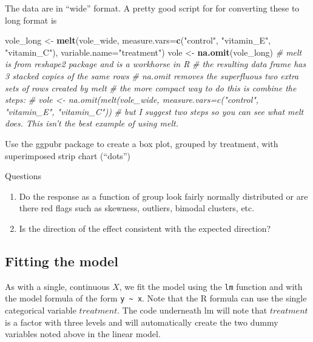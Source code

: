 \documentclass[]{book}
\newenvironment{Shaded}{\begin{snugshade}}{\end{snugshade}}
\newcommand{\KeywordTok}[1]{\textcolor[rgb]{0.13,0.29,0.53}{\textbf{#1}}}
\newcommand{\DataTypeTok}[1]{\textcolor[rgb]{0.13,0.29,0.53}{#1}}
\newcommand{\StringTok}[1]{\textcolor[rgb]{0.31,0.60,0.02}{#1}}
\newcommand{\CommentTok}[1]{\textcolor[rgb]{0.56,0.35,0.01}{\textit{#1}}}
\newcommand{\NormalTok}[1]{#1}
\providecommand{\tightlist}{%
  \setlength{\itemsep}{0pt}\setlength{\parskip}{0pt}}
\theoremstyle{definition}
\theoremstyle{definition}
\theoremstyle{definition}
\theoremstyle{remark}
\begin{document}
The data are in ``wide'' format. A pretty good script for for converting
these to long format is

\begin{Shaded}
\begin{Highlighting}[]
\NormalTok{vole_long <-}\StringTok{ }\KeywordTok{melt}\NormalTok{(vole_wide, }\DataTypeTok{measure.vars=}\KeywordTok{c}\NormalTok{(}\StringTok{"control"}\NormalTok{, }\StringTok{"vitamin_E"}\NormalTok{, }\StringTok{"vitamin_C"}\NormalTok{), }\DataTypeTok{variable.name=}\StringTok{"treatment"}\NormalTok{)}
\NormalTok{vole <-}\StringTok{ }\KeywordTok{na.omit}\NormalTok{(vole_long)}
\CommentTok{# melt is from reshape2 package and is a workhorse in R}
\CommentTok{# the resulting data frame has 3 stacked copies of the same rows}
\CommentTok{# na.omit removes the superfluous two extra sets of rows created by melt}
\CommentTok{# the more compact way to do this is combine the steps:}
\CommentTok{# vole <- na.omit(melt(vole_wide, measure.vars=c("control", "vitamin_E", "vitamin_C"))}
\CommentTok{# but I suggest two steps so you can see what melt does. This isn't the best example of using melt.}
\end{Highlighting}
\end{Shaded}

Use the ggpubr package to create a box plot, grouped by treatment, with
superimposed strip chart (``dots'')

Questions

\begin{enumerate}
\def\labelenumi{\arabic{enumi}.}
\setcounter{enumi}{1}
\tightlist
\item
  Do the response as a function of group look fairly normally
  distributed or are there red flags such as skewness, outliers, bimodal
  clusters, etc.
\item
  Is the direction of the effect consistent with the expected direction?
\end{enumerate}

\subsection{Fitting the model}\label{fitting-the-model}

As with a single, continuous \(X\), we fit the model using the
\texttt{lm} function and with the model formula of the form
\texttt{y\ \textasciitilde{}\ x}. Note that the R formula can use the
single categorical variable \(treatment\). The code underneath lm will
note that \(treatment\) is a factor with three levels and will
automatically create the two dummy variables noted above in the linear
model.
\end{document}
